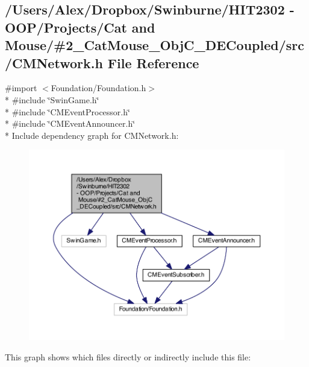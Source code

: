 \subsection{/\-Users/\-Alex/\-Dropbox/\-Swinburne/\-H\-I\-T2302 -\/ O\-O\-P/\-Projects/\-Cat and Mouse/\#2\-\_\-\-Cat\-Mouse\-\_\-\-Obj\-C\-\_\-\-D\-E\-Coupled/src/\-C\-M\-Network.h File Reference}
\label{_c_m_network_8h}
{\ttfamily \#import $<$Foundation/\-Foundation.\-h$>$}\\*
{\ttfamily \#include \char`\"{}Swin\-Game.\-h\char`\"{}}\\*
{\ttfamily \#include \char`\"{}C\-M\-Event\-Processor.\-h\char`\"{}}\\*
{\ttfamily \#include \char`\"{}C\-M\-Event\-Announcer.\-h\char`\"{}}\\*
Include dependency graph for C\-M\-Network.\-h\-:
\nopagebreak
\begin{figure}[H]
\begin{center}
\leavevmode
\includegraphics[width=350pt]{_c_m_network_8h__incl}
\end{center}
\end{figure}
This graph shows which files directly or indirectly include this file\-:
\nopagebreak
